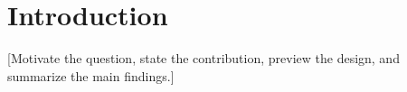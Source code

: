 \section{Introduction}

[Motivate the question, state the contribution, preview the design, and summarize the main findings.]
